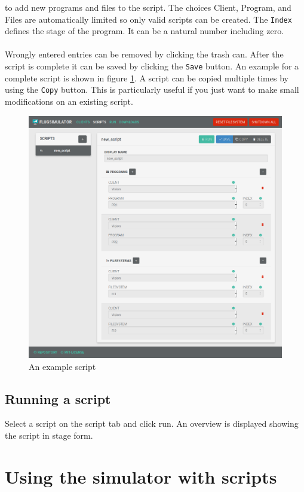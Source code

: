 \documentclass[accentcolor=tud1a, paper=a4, colorback]{tudreport}
\begin{document}
	to add new programs and files to the script. The choices Client, Program, and Files are automatically
	limited so only valid scripts can be created. The \texttt{Index} defines the stage of the
	program. It can be a natural number including zero.
	\\\\
	Wrongly entered entries can be removed by clicking the trash can. After the script is complete
	it can be saved by clicking the \texttt{Save} button. An example for a complete script
	is shown in figure \ref{example_script}. A script can be copied multiple times by using
	the \texttt{Copy} button. This is particularly useful if you just want to make small modifications
	on an existing script.
	\begin{figure}[t]
		\centering
		\includegraphics[width=.9\textwidth]{example_script}
		\caption{An example script}
		\label{example_script}
	\end{figure}

	\section{Running a script}
	Select a script on the script tab and click run. An overview is displayed showing
	the script in stage form.

	\chapter{Using the simulator with scripts}
\end{document}

